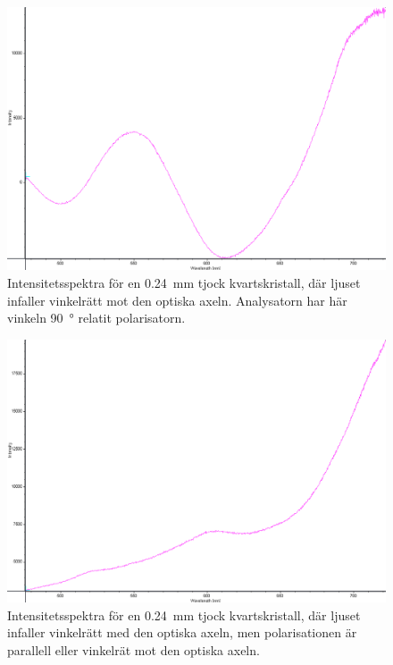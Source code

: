 \documentclass[a4paper]{article}
\begin{document}
\FloatBarrier
\begin{figure}[ht!]
	\centering
	\includegraphics[width=\linewidth]{data/spektra_180_kristall1_270_inv}
	\caption{Intensitetsspektra för en \SI{0.24}{\milli\m} tjock kvartskristall, där ljuset infaller vinkelrätt mot den optiska axeln. Analysatorn har här vinkeln \SI{+90}{\degree} relatit polarisatorn.}
	\label{fig:}
\end{figure}
\FloatBarrier

\FloatBarrier
\begin{figure}[ht!]
	\centering
	\includegraphics[width=\linewidth]{data/spektra_kristall1_optAx_inv}
	\caption{Intensitetsspektra för en \SI{0.24}{\milli\m} tjock kvartskristall, där ljuset infaller vinkelrätt med den optiska axeln, men polarisationen är parallell eller vinkelrät mot den optiska axeln.}
	\label{fig:}
\end{figure}
\FloatBarrier
\end{document}
